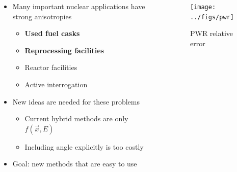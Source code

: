\documentclass[xcolor=x11names,compress,handout]{beamer}
\renewcommand{\(}{\begin{columns}}
\renewcommand{\)}{\end{columns}}
\newcommand{\<}[1]{\begin{column}{#1}}
\renewcommand{\>}{\end{column}}
\begin{document}
\begin{frame}[fragile]
	\begin{columns}
  	\begin{column}{0.5\textwidth}
	\begin{itemize}
	\item Many important nuclear applications have strong anisotropies
	 \begin{itemize}
	 \item \textbf{Used fuel casks}
	 \item \textbf{Reprocessing facilities}
	 \item Reactor facilities
	 \item Active interrogation 
	 \end{itemize}
	\pause
	\item New ideas are needed for these problems
	\begin{itemize}
	\item Current hybrid methods are only $f(\vec{x}, E)$
	\item Including angle explicitly is too costly	
	\end{itemize}
	\pause
	\item \alert{Goal}: new methods that are easy to use
	\end{itemize}
  	\end{column}
 	\begin{column}{0.5\textwidth}
 	 \begin{center}
 	 \begin{figure}
 	 \texttt{[image: ../figs/pwr]}  
 	 \caption{PWR relative error \cite{Pantelias2013}}
 	 \end{figure}
 	 \end{center}

  	\end{column}
	\end{columns}

\end{frame}
\end{document}
